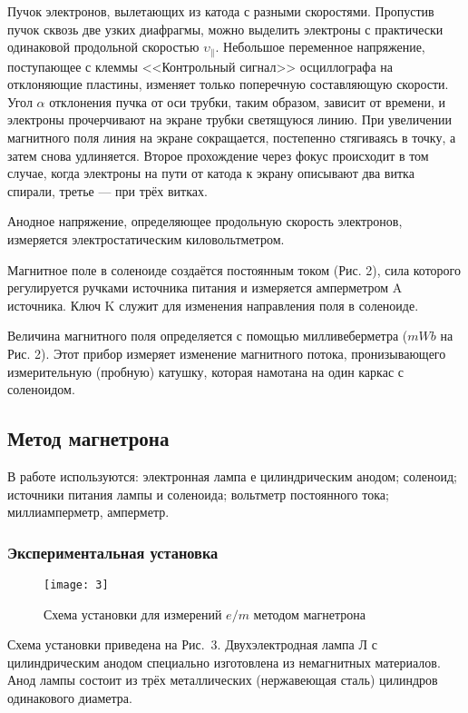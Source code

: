 Пучок электронов, вылетающих из катода с разными скоростями. Пропустив пучок сквозь две узких диафрагмы, можно выделить электроны с
практически одинаковой продольной скоростью $\upsilon_\|$. Небольшое переменное напряжение, поступающее с
клеммы <<Контрольный сигнал>> осциллографа на отклоняющие пластины, изменяет только поперечную
составляющую скорости. Угол $\alpha$ отклонения пучка от оси трубки, таким образом, зависит от времени, и электроны прочерчивают на экране трубки светящуюся линию. При увеличении магнитного поля линия на
экране сокращается, постепенно стягиваясь в точку, а затем снова удлиняется. Второе прохождение
через фокус происходит в том случае, когда электроны на пути от катода к экрану описывают два витка
спирали, третье — при трёх витках.

Анодное напряжение, определяющее продольную скорость электронов, измеряется электростатическим киловольтметром.

Магнитное поле в соленоиде создаётся постоянным током (Рис. 2), сила которого регулируется ручками
источника питания и измеряется амперметром A источника. Ключ K служит для изменения направления поля в соленоиде.

Величина магнитного поля определяется с помощью милливеберметра ($mWb$ на Рис. 2). Этот прибор
измеряет изменение магнитного потока, пронизывающего измерительную (пробную) катушку, которая
намотана на один каркас с соленоидом.
\subsection*{Метод магнетрона}
В работе используются: электронная лампа е цилиндрическим анодом; соленоид; источники питания лампы и соленоида; вольтметр постоянного тока; миллиамперметр, амперметр.
\subsubsection*{Экспериментальная установка}

\begin{wrapfigure}{r}{0.5\linewidth}
    \texttt{[image: 3]}
    \captionsetup{justification=centering}
    \caption{Схема установки для измерений $e/m$ методом магнетрона}
\end{wrapfigure}


Схема установки приведена на Рис.~3. Двухэлектродная лампа Л с цилиндрическим анодом специально
изготовлена из немагнитных материалов. Анод лампы состоит из трёх металлических (нержавеющая сталь)
цилиндров одинакового диаметра.

